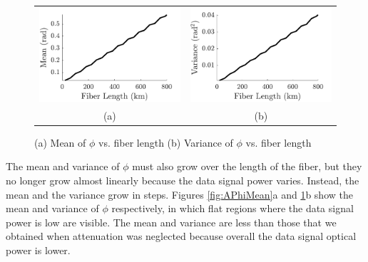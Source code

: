 %
\begin{figure}[htb]
	\begin{tabular}{c c}
		\includegraphics[width=0.5\linewidth]{img/APhiMean} & \includegraphics[width=0.5\linewidth]{img/APhiVar} \\
		(a) & (b)
	\end{tabular}
	\caption{(a)\label{fig:APhiMean} Mean of $\phi$ vs. fiber length (b)\label{fig:APhiVar} Variance of $\phi$ vs. fiber length}
\end{figure}
%
The mean and variance of $\phi$ must also grow over the length of the fiber, but they no longer grow almost linearly because the data signal power varies. Instead, the mean and the variance grow in steps. Figures \ref{fig:APhiMean}a and \ref{fig:APhiVar}b show the mean and variance of $\phi$ respectively, in which flat regions where the data signal power is low are visible. The mean and variance are less than those that we obtained when attenuation was neglected because overall the data signal optical power is lower.

